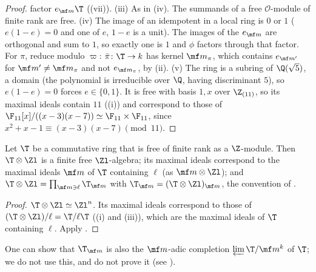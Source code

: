 \begin{proof}
factor $e_{\mf m}\T$ ((vii)).
(iii) As in (iv). The summands of a free $\mathcal O$-module of finite rank are free.
(iv) The image of an idempotent in a local ring is $0$ or $1$ ($e(1-e)=0$ and one of $e$, $1-e$ is a unit). The images of the $e_{\mf m}$ are orthogonal and
sum to $1$, so exactly one is $1$ and $\phi$ factors through that factor. For $\pi$, reduce modulo $\varpi$: $\bar\pi\colon\T\to k$ has kernel $\mf m_\pi$, which contains
$e_{\mf m'}$ for $\mf m'\ne\mf m_\pi$ and not $e_{\mf m_\pi}$, by (ii).
(v) The ring is a subring of $\Q(\sqrt5)$, a domain (the polynomial is irreducible over $\Q$, having discriminant $5$), so $e(1-e)=0$ forces $e\in\{0,1\}$. It is free
with basis $1,x$ over $\Z_{(11)}$, so its maximal ideals contain $11$ ((i)) and correspond to those of
$\F_{11}[x]/((x-3)(x-7))\simeq\F_{11}\times\F_{11}$, since $x^2+x-1\equiv(x-3)(x-7)\pmod{11}$.
\end{proof}

\begin{corollary}\label{cor:modules:hecke-type}
Let $\T$ be a commutative ring that is free of finite rank as a $\Z$-module. Then $\T\otimes\Zl$ is a finite free $\Zl$-algebra; its maximal ideals correspond
to the maximal ideals $\mf m$ of $\T$ containing $\ell$ (as $\mf m\otimes\Zl$); and $\T\otimes\Zl=\prod_{\mf m\ni\ell}\T_{\mf m}$ with $\T_{\mf m}=(\T\otimes\Zl)_{\mf m}$, the convention
of .
\end{corollary}

\begin{proof}
$\T\otimes\Zl\simeq\Zl^n$. Its maximal ideals correspond to those of $(\T\otimes\Zl)/\ell=\T/\ell\T$ ((i) and
(iii)), which are the maximal ideals of $\T$ containing $\ell$. Apply .
\end{proof}

\begin{remark}\label{rem:modules:completion}
One can show that $\T_{\mf m}$ is also the $\mf m$-adic completion $\varprojlim\T/\mf m^k$ of $\T$; we do not use this, and do not prove it (see \cite[Chapter 7]{Eisenbud}).
\end{remark}

